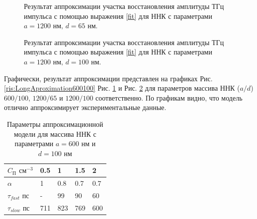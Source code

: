 \documentclass[a4paper,14pt,russian]{extreport}
\begin{document}
				\begin{figure}[h]
					\caption{Результат аппроксимации участка восстановления амплитуды ТГц импульса с помощью выражения \ref{fit} для ННК с параметрами $a = 1200 \text{ нм, } d = 65 \text{ нм}$.}
				\label{ris:LongAproximation120065}
				\end{figure}
				\begin{figure}[h]
					\caption{Результат аппроксимации участка восстановления амплитуды ТГц импульса с помощью выражения \ref{fit} для ННК с параметрами $a = 1200 \text{ нм, } d = 100 \text{ нм}$.}
				\label{ris:LongAproximation1200100}
				\end{figure}
					Графически, результат аппроксимации представлен на графиках Рис. \ref{ris:LongAproximation600100} Рис. \ref{ris:LongAproximation120065} и Рис. \ref{ris:LongAproximation1200100} для параметров массива ННК ($a/d$) $600/100$, $1200/65$ и $1200/100$ соответственно. По графикам видно, что модель отлично аппроксимирует экспериментальные данные.\par
\begin{table}[H]
\centering
\caption{Параметры аппроксимационной модели для массива ННК с параметрами $a = 600$ нм и $d = 100$ нм}
\label{table:Coefitients600100}
\begin{tabular}{@{}lllll@{}}
\toprule
$C_\text{П}$ $\text{см}^{-3}$ & 0.5 & 1   & 1.5 & 2   \\ \midrule
$\alpha$                                               & 1   & 0.8 & 0.7 & 0.7 \\
$\tau_{fast}$ пс                                       & -   & 99  & 90  & 60  \\
$\tau_{slow}$ пс                                      & 711 & 823 & 769 & 600 \\ \bottomrule
\end{tabular}
\end{table}
\end{document}
